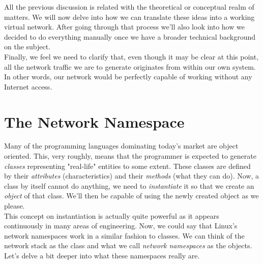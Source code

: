         All the previous discussion is related with the theoretical or conceptual realm of matters. We will now delve into how we can translate these ideas into a working virtual network. After going through that process we'll also look into how we decided to do everything manually once we have a broader technical background on the subject.\\

        Finally, we feel we need to clarify that, even though it may be clear at this point, all the network traffic we are to generate originates from within our own system. In other words, our network would be perfectly capable of working without any Internet access.\\

    \section{The Network Namespace}


        Many of the programming languages dominating today's market are object oriented. This, very roughly, means that the programmer is expected to generate \textit{classes} representing "real-life" entities to some extent. These classes are defined by their \textit{attributes} (characteristics) and their \textit{methods} (what they can do). Now, a class by itself cannot do anything, we need to \textit{instantiate} it so that we create an \textit{object} of that class. We'll then be capable of using the newly created object as we please.\\

        This concept on instantiation is actually quite powerful as it appears continuously in many areas of engineering. Now, we could say that Linux's network namespaces work in a similar fashion to classes. We can think of the network stack as the class and what we call \textit{network namespaces} as the objects. Let's delve a bit deeper into what these namespaces really are.\\

